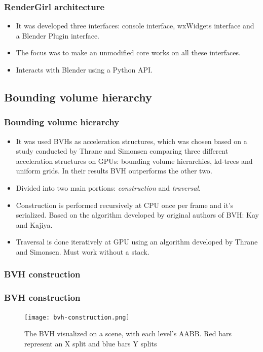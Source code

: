\documentclass{beamer}
\newenvironment{figure*}%
{\begin{figure}}
{\end{figure}}
\begin{document}
\begin{frame}
\frametitle{RenderGirl architecture}
\begin{itemize}
\item It was developed three interfaces: console interface, wxWidgets
  interface and a Blender Plugin interface.
\item The focus was to make an unmodified core works on all these
  interfaces.
\item Interacts with Blender using a Python API.
\end{itemize}
\end{frame}


\subsection{Bounding volume hierarchy}
\begin{frame}
  \frametitle{Bounding volume hierarchy}
\begin{itemize}
\item It was used BVHs as acceleration structures, which was chosen
  based on a study conducted by Thrane and Simonsen comparing three
  different acceleration structures on GPUs: bounding volume
  hierarchies, kd-trees and uniform grids. In their results BVH
  outperforms the other
  two\cite{Thrane}. %
\item Divided into two main portions: \emph{construction} and \emph{traversal}.
\item Construction is performed recursively at CPU once per frame and
  it's serialized. Based on the algorithm developed by original
  authors of BVH: Kay and Kajiya\cite{kay1986ray}.
\item Traversal is done iteratively at GPU using an algorithm
  developed by Thrane and Simonsen. Must work without a stack.
\end{itemize}

\end{frame}


\subsubsection{BVH construction}
\begin{frame}
  \frametitle{BVH construction}
\begin{figure}
\centering
\texttt{[image: bvh-construction.png]}
\caption{The BVH visualized on a scene, with each level's AABB. Red
  bars represent an X split and blue bars Y splits}
\label{fig:bvh-construction}
\end{figure}

\end{frame}
\end{document}
